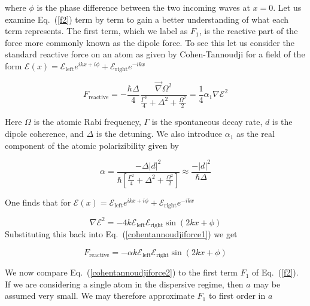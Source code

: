 \documentclass[twocolumn,english,pra,aps,superscriptaddress,floatfix]{revtex4-1}
\begin{document}
where $\phi$ is the phase difference between the two incoming waves at $x=0$. Let us examine Eq.\ (\ref{f2}) term by term to gain a better understanding
of what each term represents. The first term, which we label as $F_{1}$, is the reactive part of the force more commonly known as the dipole force. To see this let us consider the standard reactive force on an atom as given by Cohen-Tannoudji \cite{cohentannoudji} for a field of the form $\mathcal{E}(x)=\mathcal{E}_{\mathrm{left}}e^{ikx+i\phi}+\mathcal{E}_{\mathrm{right}}e^{-ikx}$ 

\begin{equation}
F_{\mathrm{reactive}}=-\frac{\hbar\Delta}{4}\frac{\overrightarrow{\nabla}\Omega^{2}}{\frac{\Gamma^{2}}{4}+\Delta^{2}+\frac{\Omega^{2}}{2}}=\frac{1}{4}\alpha_{1}\nabla \mathcal{E}^{2}
\label{cohentannoudjiforce1}
\end{equation}

Here $\Omega$ is the atomic Rabi frequency, $\Gamma$ is the spontaneous decay rate, $d$ is the dipole coherence, and $\Delta$ is the detuning.
We also introduce $\alpha_{1}$ as the real component of the atomic polarizibility given by

\begin{equation}
\alpha=\frac{-\Delta\left|d\right|^{2}}{\hbar\left[\frac{\Gamma^{2}}{4}+\Delta^{2}+\frac{\Omega^{2}}{2}\right]}\approx\frac{-\left|d\right|^{2}}{\hbar\Delta}
\label{polarizibility1}
\end{equation}

One finds that for $\mathcal{E}(x)=\mathcal{E}_{\mathrm{left}}e^{ikx+i\phi}+\mathcal{E}_{\mathrm{right}}e^{-ikx}$

\begin{equation}
\nabla \mathcal{E}^{2}=-4k\mathcal{E}_{\mathrm{left}}\mathcal{E}_{\mathrm{right}}\sin\left(2kx+\phi\right)
\label{gradiantE}
\end{equation}
Substituting this back into Eq.\ (\ref{cohentannoudjiforce1}) we get

\begin{equation}
F_{\mathrm{reactive}}=-\alpha k\mathcal{E}_{\mathrm{left}}\mathcal{E}_{\mathrm{right}}\sin\left(2kx+\phi\right)
\label{cohentannoudjiforce2}
\end{equation}

We now compare Eq.\ (\ref{cohentannoudjiforce2}) to the first term $F_{1}$ of Eq.\ (\ref{f2}). If we are considering a single atom in the dispersive regime, then
$a$ may be assumed very small. We may therefore approximate $F_{1}$ to first order in $a$ 
\end{document}
